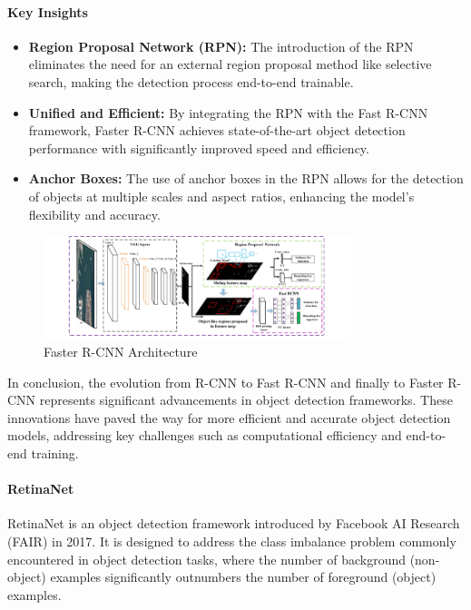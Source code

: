 \documentclass[12pt]{article}
\begin{document}
\paragraph{Key Insights}

\begin{itemize}
    \item \textbf{Region Proposal Network (RPN):} The introduction of the RPN eliminates the need for an external region proposal method like selective search, making the detection process end-to-end trainable.

    \item \textbf{Unified and Efficient:} By integrating the RPN with the Fast R-CNN framework, Faster R-CNN achieves state-of-the-art object detection performance with significantly improved speed and efficiency.

    \item \textbf{Anchor Boxes:} The use of anchor boxes in the RPN allows for the detection of objects at multiple scales and aspect ratios, enhancing the model's flexibility and accuracy.
\end{itemize}

\begin{figure}[h]
    \centering
    \includegraphics[width=0.8\textwidth]{./media/faster-rcnn.png}
    \caption{Faster R-CNN Architecture}
    \label{fig:fast_rcnn}
\end{figure}

In conclusion, the evolution from R-CNN to Fast R-CNN and finally to Faster R-CNN represents significant advancements in object detection frameworks. These innovations have paved the way for more efficient and accurate object detection models, addressing key challenges such as computational efficiency and end-to-end training.

\paragraph{RetinaNet}

RetinaNet is an object detection framework introduced by Facebook AI Research (FAIR) in 2017. It is designed to address the class imbalance problem commonly encountered in object detection tasks, where the number of background (non-object) examples significantly outnumbers the number of foreground (object) examples.
\end{document}
